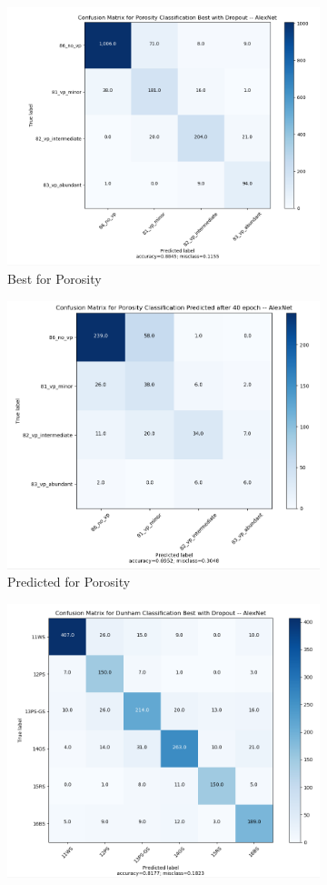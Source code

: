 \begin{figure}
\begin{subfigure}{.5\textwidth}
  \centering
  \includegraphics[width=.8\linewidth]{figures/04-al_baby_best.PNG}
  \caption{Best for Porosity}
  \label{fig:rescm_poro}
\end{subfigure}%
\begin{subfigure}{.5\textwidth}
  \centering
  \includegraphics[width=.8\linewidth]{figures/04-al_baby_pred.PNG}
  \caption{Predicted for Porosity}
  \label{fig:rescmpred_poro}
\end{subfigure}
\begin{subfigure}{.5\textwidth}
  \centering
  \includegraphics[width=.8\linewidth]{figures/04-al_dunham_best.PNG}

\end{subfigure}
\end{figure}
